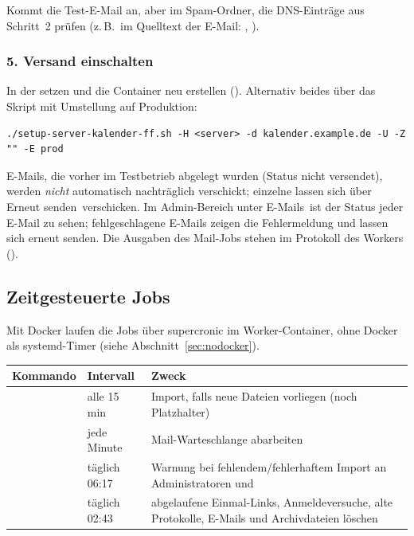 Kommt die Test-E-Mail an, aber im Spam-Ordner, die DNS-Einträge aus Schritt~2
prüfen (z.\,B.\ im Quelltext der E-Mail: ,
).

\subsubsection*{5. Versand einschalten}

In der   setzen und die Container neu
erstellen (). Alternativ beides über das
Skript mit Umstellung auf Produktion:

\begin{lstlisting}
./setup-server-kalender-ff.sh -H <server> -d kalender.example.de -U -Z "" -E prod
\end{lstlisting}

E-Mails, die vorher im Testbetrieb abgelegt wurden (Status
\glqq nicht versendet\grqq), werden \emph{nicht} automatisch nachträglich
verschickt; einzelne lassen sich über \glqq Erneut senden\grqq\ verschicken.
Im Admin-Bereich unter \glqq E-Mails\grqq\ ist der Status jeder E-Mail zu
sehen; fehlgeschlagene E-Mails zeigen die Fehlermeldung und lassen sich
erneut senden. Die Ausgaben des Mail-Jobs stehen im Protokoll des Workers
().

\subsection{Zeitgesteuerte Jobs}

Mit Docker laufen die Jobs über supercronic im Worker-Container, ohne Docker
als systemd-Timer (siehe Abschnitt~\ref{sec:nodocker}).

\begin{center}
\begin{tabularx}{\textwidth}{L{4.6cm}L{3.0cm}X}
\toprule
\textbf{Kommando} & \textbf{Intervall} & \textbf{Zweck} \\
\midrule
{} & alle 15 min & Import, falls neue Dateien vorliegen
  (noch Platzhalter) \\
 & jede Minute & Mail-Warteschlange abarbeiten \\
 & täglich 06:17 & Warnung bei fehlendem/fehlerhaftem
  Import an Administratoren und  \\
 & täglich 02:43 & abgelaufene Einmal-Links,
  Anmeldeversuche, alte Protokolle, E-Mails und Archivdateien löschen \\
\bottomrule
\end{tabularx}
\end{center}


